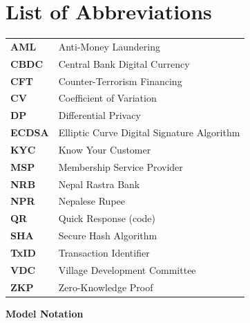 \newpage\thispagestyle{empty}
\chapter*{List of Abbreviations}
\vspace{0.5cm}

\begin{longtable}{p{3.5cm} p{10cm}}
\textbf{AML}      & Anti-Money Laundering\\[0.4em]
\textbf{CBDC}     & Central Bank Digital Currency\\[0.4em]
\textbf{CFT}      & Counter-Terrorism Financing\\[0.4em]
\textbf{CV}       & Coefficient of Variation\\[0.4em]
\textbf{DP}       & Differential Privacy\\[0.4em]
\textbf{ECDSA}    & Elliptic Curve Digital Signature Algorithm\\[0.4em]
\textbf{KYC}      & Know Your Customer\\[0.4em]
\textbf{MSP}      & Membership Service Provider\\[0.4em]
\textbf{NRB}      & Nepal Rastra Bank\\[0.4em]
\textbf{NPR}      & Nepalese Rupee\\[0.4em]
\textbf{QR}       & Quick Response (code)\\[0.4em]
\textbf{SHA}      & Secure Hash Algorithm\\[0.4em]
\textbf{TxID}     & Transaction Identifier\\[0.4em]
\textbf{VDC}      & Village Development Committee\\[0.4em]
\textbf{ZKP}      & Zero-Knowledge Proof\\[0.4em]
\end{longtable}

\vspace{1em}
\noindent\textbf{Model Notation}
\vspace{0.5em}


